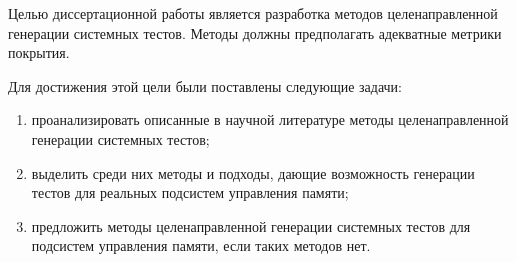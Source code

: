 Целью диссертационной работы является разработка методов целенаправленной генерации системных тестов. Методы должны предполагать адекватные метрики покрытия.

Для достижения этой цели были поставлены следующие задачи:
\begin{enumerate}
	\item проанализировать описанные в научной литературе методы целенаправленной генерации системных тестов;
	\item выделить среди них методы и подходы, дающие возможность генерации тестов для реальных подсистем управления памяти;
	\item предложить методы целенаправленной генерации системных тестов для подсистем управления памяти, если таких методов нет.
\end{enumerate}
